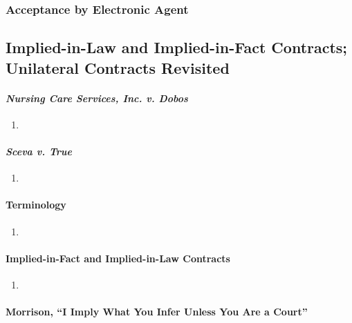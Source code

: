 \subsubsection{Acceptance by Electronic Agent}


\subsection{Implied-in-Law and Implied-in-Fact Contracts; Unilateral Contracts 
Revisited}

\paragraph{\emph{Nursing Care Services, Inc. v. Dobos}}

\begin{enumerate}
    \item %
\end{enumerate}

\paragraph{\emph{Sceva v. True}}

\begin{enumerate}
    \item %
\end{enumerate}

\paragraph{Terminology}

\begin{enumerate}
    \item %
\end{enumerate}

\paragraph{Implied-in-Fact and Implied-in-Law Contracts}

\begin{enumerate}
    \item %
\end{enumerate}

\paragraph{Morrison, ``I Imply What You Infer Unless You Are a Court''}


